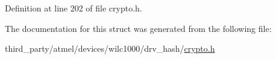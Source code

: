 Definition at line 202 of file crypto.\+h.



The documentation for this struct was generated from the following file\+:\begin{DoxyCompactItemize}
\item 
third\+\_\+party/atmel/devices/wilc1000/drv\+\_\+hash/\hyperlink{third__party_2atmel_2devices_2wilc1000_2drv__hash_2crypto_8h}{crypto.\+h}\end{DoxyCompactItemize}
